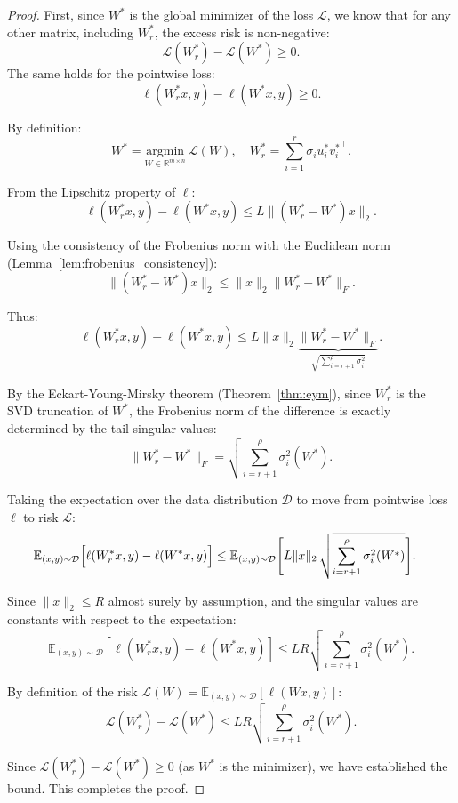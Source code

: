 \documentclass{article}
\theoremstyle{plain}
\theoremstyle{definition}
\theoremstyle{remark}
\begin{document}
\begin{proof}
First, since $W^*$ is the global minimizer of the loss $\mathcal{L}$, we know that for any other matrix, including $W^*_r$, the excess risk is non-negative:
\[
\mathcal{L}(W^*_r) - \mathcal{L}(W^*) \geq 0.
\]
The same holds for the pointwise loss:
\[
\ell(W^*_r x, y) - \ell(W^* x, y) \geq 0.
\]

By definition:
\[
W^* = \underset{W \in \mathbb{R}^{m \times n}}{\mathrm{argmin}} \ \mathcal{L}(W),
\quad
W^*_r = \sum_{i=1}^{r} \sigma_i u_i^* {v_i^*}^\top.
\]

From the Lipschitz property of $\ell$:
\[
\ell(W^*_r x, y) - \ell(W^* x, y) \leq L \|(W^*_r - W^*)x\|_2.
\]

Using the consistency of the Frobenius norm with the Euclidean norm (Lemma~\ref{lem:frobenius_consistency}):
\[
\|(W^*_r - W^*)x\|_2 \leq \|x\|_2 \|W^*_r - W^*\|_F.
\]

Thus:
\[
\ell(W^*_r x, y) - \ell(W^* x, y) \leq L\|x\|_2 \underbrace{\|W^*_r - W^*\|_F}_{\sqrt{\sum_{i=r+1}^{\rho} \sigma_i^2}}.
\]

By the Eckart-Young-Mirsky theorem (Theorem~\ref{thm:eym}), since $W^*_r$ is the SVD truncation of $W^*$, the Frobenius norm of the difference is exactly determined by the tail singular values:
\[
\|W^*_r - W^*\|_F = \sqrt{\sum_{i=r+1}^{\rho} \sigma_i^2(W^*)}.
\]

Taking the expectation over the data distribution $\mathcal{D}$ to move from pointwise loss $\ell$ to risk $\mathcal{L}$:
\[
\begin{aligned}
\mathbb{E}_{(x,y) \sim \mathcal{D}}
\Bigl[\ell(W^*_r x, y) - \ell(W^* x, y)\Bigr]
&\leq
\mathbb{E}_{(x,y) \sim \mathcal{D}}
\Biggl[
L\|x\|_2\,
\sqrt{\sum_{i=r+1}^{\rho} \sigma_i^2(W^*)}
\Biggr].
\end{aligned}
\]

Since $\|x\|_2 \leq R$ almost surely by assumption, and the singular values are constants with respect to the expectation:
\[
\mathbb{E}_{(x,y) \sim \mathcal{D}}\left[\ell(W^*_r x, y) - \ell(W^* x, y)\right] 
\leq LR\sqrt{\sum_{i=r+1}^{\rho} \sigma_i^2(W^*)}.
\]

By definition of the risk $\mathcal{L}(W) = \mathbb{E}_{(x,y) \sim \mathcal{D}}[\ell(Wx, y)]$:
\[
\mathcal{L}(W^*_r) - \mathcal{L}(W^*) \leq LR\sqrt{\sum_{i=r+1}^{\rho} \sigma_i^2(W^*)}.
\]

Since $\mathcal{L}(W^*_r) - \mathcal{L}(W^*) \geq 0$ (as $W^*$ is the minimizer), we have established the bound. This completes the proof.
\end{proof}
\end{document}
